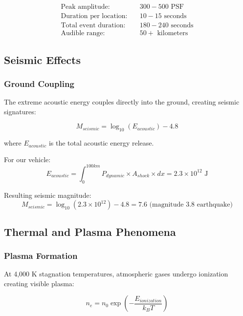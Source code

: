 \documentclass[12pt,a4paper]{article}
\begin{document}
\begin{align}
\text{Peak amplitude:} &\quad 300-500 \text{ PSF} \\
\text{Duration per location:} &\quad 10-15 \text{ seconds} \\
\text{Total event duration:} &\quad 180-240 \text{ seconds} \\
\text{Audible range:} &\quad 50+ \text{ kilometers}
\end{align}

\subsection{Seismic Effects}

\subsubsection{Ground Coupling}
The extreme acoustic energy couples directly into the ground, creating seismic signatures:

\begin{equation}
M_{seismic} = \log_{10}(E_{acoustic}) - 4.8
\label{eq:seismic_magnitude}
\end{equation}

where $E_{acoustic}$ is the total acoustic energy release.

For our vehicle:
\begin{equation}
E_{acoustic} = \int_0^{100km} P_{dynamic} \times A_{shock} \times dx = 2.3 \times 10^{12} \text{ J}
\label{eq:acoustic_energy}
\end{equation}

Resulting seismic magnitude:
\begin{equation}
M_{seismic} = \log_{10}(2.3 \times 10^{12}) - 4.8 = 7.6 \text{ (magnitude 3.8 earthquake)}
\label{eq:seismic_calc}
\end{equation}

\subsection{Thermal and Plasma Phenomena}

\subsubsection{Plasma Formation}
At 4,000 K stagnation temperatures, atmospheric gases undergo ionization creating visible plasma:

\begin{equation}
n_e = n_0 \exp\left(-\frac{E_{ionization}}{k_B T}\right)
\label{eq:electron_density}
\end{equation}
\end{document}
